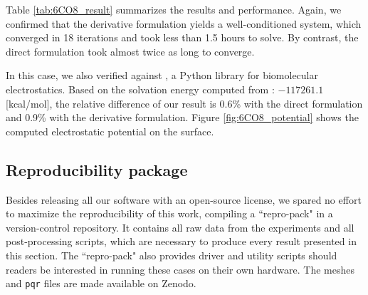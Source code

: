 Table \ref{tab:6CO8_result} summarizes the results and performance.
Again, we confirmed that the derivative formulation yields a well-conditioned system, which converged in 18 iterations and took less than 1.5 hours to solve.
By contrast, the direct formulation took almost twice as long to converge.

In this case, we also verified against \pygbe \cite{cooper2016pygbe}, a Python \bem library for biomolecular electrostatics.
Based on the solvation energy computed from \pygbe: $-117261.1$ [kcal/mol], the relative difference of our result is 0.6\% with the direct formulation and 0.9\% with the derivative formulation.
Figure \ref{fig:6CO8_potential} shows the computed electrostatic potential on the surface.

\subsection{Reproducibility package}

Besides releasing all our software with an open-source license, we spared no effort to maximize the reproducibility of this work, compiling a ``repro-pack" in a version-control repository.
It contains all raw data from the experiments and all post-processing scripts, which are necessary to produce every result presented in this section.
The ``repro-pack" also provides driver and utility scripts should readers be interested in running these cases on their own hardware.
The meshes and \texttt{pqr} files are made available on Zenodo.